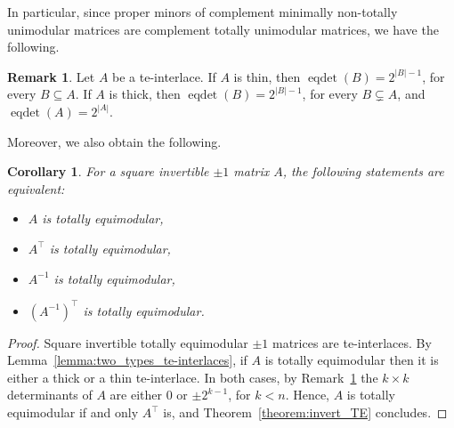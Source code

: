 \documentclass[11pt,a4paper]{amsart}
\theoremstyle{plain}
\newtheorem{corollary}[theorem]{Corollary}
\theoremstyle{definition}
\newtheorem{remark}[theorem]{Remark}
\DeclareMathOperator{\eqdet}{eqdet}
\begin{document}
In particular, since proper minors of complement minimally non-totally unimodular matrices are complement totally unimodular matrices, we have the following.
\begin{remark}\label{remark:eqdet_te-interlaces}
Let $A$ be a te-interlace.
If $A$ is thin, then $\eqdet(B)=2^{|B|-1}$, for every $B\subseteq A$.
If $A$ is thick, then $\eqdet(B)=2^{|B|-1}$, for every $B\subsetneq A$, and $\eqdet(A)=2^{|A|}$.
\end{remark}

Moreover, we also obtain the following.


\begin{corollary}\label{corollary:transpose_TE}
For a square invertible $\pm1$ matrix $A$, the following statements are equivalent:
\begin{itemize}
\item $A$ is totally equimodular,
\item $A^\top$ is totally equimodular,
\item $A^{-1}$ is totally equimodular,
\item $\left(A^{-1}\right)^\top$ is totally equimodular.
\end{itemize}
\end{corollary}
\begin{proof}
Square invertible totally equimodular $\pm1$ matrices are te-interlaces.
By Lemma~\ref{lemma:two_types_te-interlaces}, if $A$ is totally equimodular then it is either a thick or a thin te-interlace.
In both cases, by Remark~\ref{remark:eqdet_te-interlaces} the $k\times k$ determinants of $A$ are either $0$ or $\pm 2^{k-1}$, for $k<n$. 
Hence, $A$ is totally equimodular if and only $A^\top$ is, 	and Theorem~\ref{theorem:invert_TE} concludes.
\end{proof}
\end{document}
